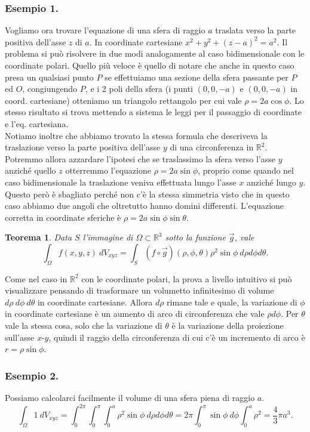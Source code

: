 \documentclass[10pt]{article}
\theoremstyle{plain}
\newtheorem{thm}{Teorema}[section]
\theoremstyle{definition}
\begin{document}
\subsubsection{Esempio 1.}
Vogliamo ora trovare l'equazione di una sfera di raggio $a$ traslata verso la parte positiva dell'asse $z$ di $a$. In coordinate cartesiane $x^2+y^2+(z-a)^2=a^2$. Il problema si può risolvere in due modi analogamente al caso bidimensionale con le coordinate polari. Quello più veloce è quello di notare che anche in questo caso presa un qualsiasi punto $P$ se effettuiamo una sezione della sfera passante per $P$ ed $O$, congiungendo $P$, e i 2 poli della sfera (i punti $(0, 0, -a)$ e $(0, 0, -a)$ in coord. cartesiane) otteniamo un triangolo rettangolo per cui vale $\rho = 2a\cos \phi$. Lo stesso risultato si trova mettendo a sistema le leggi per il passaggio di coordinate e l'eq. cartesiana.
\\ Notiamo inoltre che abbiamo trovato la stessa formula che descriveva la traslazione verso la parte positiva dell'asse $y$ di una circonferenza in $\mathbb{R}^2$. Potremmo allora azzardare l'ipotesi che se traslassimo la sfera verso l'asse $y$ anziché quello $z$ otterremmo l'equazione $\rho = 2a\sin \phi$, proprio come quando nel caso bidimensionale la traslazione veniva effettuata lungo l'asse $x$ anziché lungo $y$. Questo però è sbagliato perché non c'è la stessa simmetria visto che in questo caso abbiamo due angoli che oltretutto hanno domini differenti. L'equazione corretta in coordinate sferiche è $\rho=2a\sin \phi \sin{\theta}$.
\\
\begin{thm}
Data $S$ l'immagine di $\Omega \subset \mathbb{R}^3$ sotto la funzione $\vec{g}$, vale
$$\int_{\Omega} f(x,y,z)\ dV_{xyz} = \int_S (f\circ \vec{g}) (\rho, \phi, \theta) \rho^2 \sin{\phi} \ d\rho d\phi d\theta. $$
\end{thm}
Come nel caso in $\mathbb{R}^2$ con le coordinate polari, la prova a livello intuitivo si può visualizzare pensando di trasformare un volumetto infinitesimo di volume $d\rho \ d\phi \ d\theta$ in coordinate cartesiane. Allora $d\rho$ rimane tale e quale, la variazione di $\phi$ in coordinate cartesiane è un aumento di arco di circonferenza che vale $\rho d\phi$. Per $\theta$ vale la stessa cosa, solo che la variazione di $\theta$ è la variazione della proiezione sull'asse $x$-$y$, quindi il raggio della circonferenza di cui c'è un incremento di arco è $r = \rho \sin\phi$. 

\subsubsection{Esempio 2.}
Possiamo calcolarci facilmente il volume di una sfera piena di raggio $a$.
$$\int_{\Omega} 1\ dV_{xyz} = \int_0^{2\pi} \int_0^{\pi} \int_0^a  \rho^2 \sin{\phi} \ d\rho d\phi d\theta = 2\pi \int_0^{\pi} \sin \phi \ d\phi \int_0^{a} \rho ^2 = \frac{4}{3}\pi a^3. $$
\end{document}
